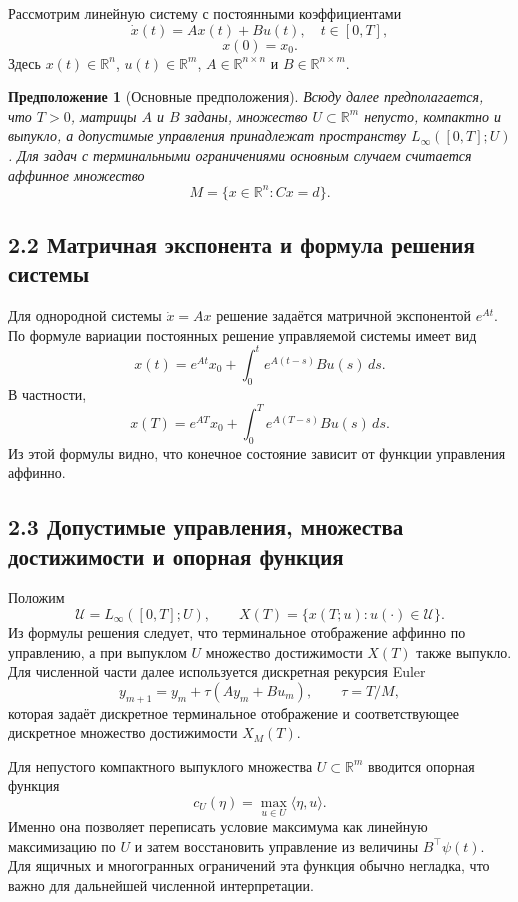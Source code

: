 \documentclass[a4paper,12pt]{article}
\newtheorem{assumption}{Предположение}
\begin{document}
Рассмотрим линейную систему с постоянными коэффициентами\cite[с. 15--31]{kiselev2007}\cite[с. 76--91]{lee1972}
\[
\dot{x}(t)=Ax(t)+Bu(t),\quad t\in[0,T],
\]
\[
x(0)=x_0.
\]
Здесь $x(t)\in\mathbb{R}^n$, $u(t)\in\mathbb{R}^m$, $A\in\mathbb{R}^{n\times n}$ и $B\in\mathbb{R}^{n\times m}$.

\begin{assumption}[Основные предположения]
Всюду далее предполагается, что $T>0$, матрицы $A$ и $B$ заданы, множество $U\subset\mathbb{R}^m$ непусто, компактно и выпукло, а допустимые управления принадлежат пространству $L_\infty([0,T];U)$. Для задач с терминальными ограничениями основным случаем считается аффинное множество
\[
M=\{x\in\mathbb{R}^n:Cx=d\}.
\]
\end{assumption}

\subsection{2.2 Матричная экспонента и формула решения системы}

Для однородной системы $\dot{x}=Ax$ решение задаётся матричной экспонентой $e^{At}$\cite[с. 15--31]{kiselev2007}\cite[с. 76--91]{lee1972}. По формуле вариации постоянных решение управляемой системы имеет вид
\[
x(t)=e^{At}x_0+\int_0^t e^{A(t-s)}Bu(s)\,ds.
\]
В частности,
\[
x(T)=e^{AT}x_0+\int_0^T e^{A(T-s)}Bu(s)\,ds.
\]
Из этой формулы видно, что конечное состояние зависит от функции управления аффинно.

\subsection{2.3 Допустимые управления, множества достижимости и опорная функция}

Положим
\[
\mathcal{U}=L_\infty([0,T];U),\qquad
X(T)=\{x(T;u):u(\cdot)\in\mathcal U\}.
\]
Из формулы решения следует, что терминальное отображение аффинно по управлению, а при выпуклом $U$ множество достижимости $X(T)$ также выпукло\cite[с. 76--91]{lee1972}\cite[с. 32--40]{kiselev2007}. Для численной части далее используется дискретная рекурсия Euler
\[
y_{m+1}=y_m+\tau(Ay_m+Bu_m),\qquad \tau=T/M,
\]
которая задаёт дискретное терминальное отображение и соответствующее дискретное множество достижимости $X_M(T)$.

Для непустого компактного выпуклого множества $U\subset\mathbb{R}^m$ вводится опорная функция
\[
c_U(\eta)=\max_{u\in U}\langle \eta,u\rangle.
\]
Именно она позволяет переписать условие максимума как линейную максимизацию по $U$ и затем восстановить управление из величины $B^\top\psi(t)$. Для ящичных и многогранных ограничений эта функция обычно негладка, что важно для дальнейшей численной интерпретации.
\end{document}
